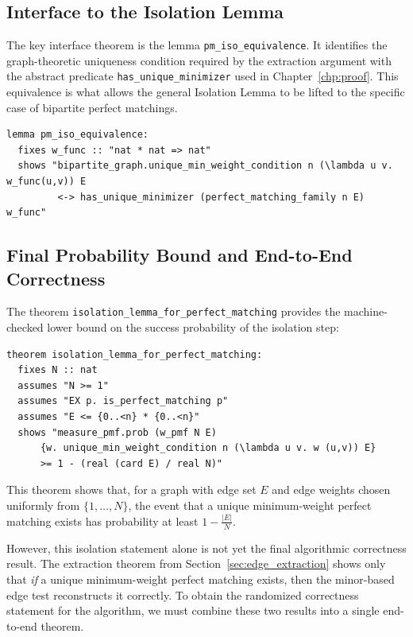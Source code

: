 \subsection{Interface to the Isolation Lemma}
The key interface theorem is the lemma \texttt{pm\_iso\_equivalence}.
It identifies the graph-theoretic uniqueness condition required by the extraction argument with the abstract predicate \texttt{has\_unique\_minimizer} used in Chapter~\ref{chp:proof}.
This equivalence is what allows the general Isolation Lemma to be lifted to the specific case of bipartite perfect matchings.

\listingneedspace
\begin{lstlisting}[language=Isabelle, caption={Equivalence between perfect-matching uniqueness and the abstract minimizer predicate}]
lemma pm_iso_equivalence:
  fixes w_func :: "nat * nat => nat"
  shows "bipartite_graph.unique_min_weight_condition n (\lambda u v. w_func(u,v)) E
         <-> has_unique_minimizer (perfect_matching_family n E) w_func"
\end{lstlisting}

\subsection{Final Probability Bound and End-to-End Correctness}
The theorem \texttt{isolation\_lemma\_for\_perfect\_matching} provides the machine-checked lower bound on the success probability of the isolation step:

\biglistingneedspace
\begin{lstlisting}[language=Isabelle, caption={Isolation Lemma instantiated for Perfect Matching}]
theorem isolation_lemma_for_perfect_matching:
  fixes N :: nat
  assumes "N >= 1"
  assumes "EX p. is_perfect_matching p"
  assumes "E <= {0..<n} * {0..<n}"
  shows "measure_pmf.prob (w_pmf N E)
      {w. unique_min_weight_condition n (\lambda u v. w (u,v)) E}
      >= 1 - (real (card E) / real N)"
\end{lstlisting}

This theorem shows that, for a graph with edge set $E$ and edge weights chosen uniformly from $\{1, \dots, N\}$, the event that a unique minimum-weight perfect matching exists has probability at least $1 - \frac{|E|}{N}$.

However, this isolation statement alone is not yet the final algorithmic correctness result.
The extraction theorem from Section~\ref{sec:edge_extraction} shows only that \emph{if} a unique minimum-weight perfect matching exists, then the minor-based edge test reconstructs it correctly.
To obtain the randomized correctness statement for the algorithm, we must combine these two results into a single end-to-end theorem.

